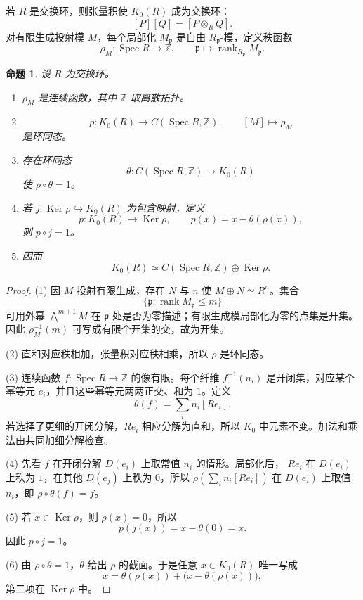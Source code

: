\documentclass[11pt,a4paper,openany]{ctexbook}
\numberwithin{equation}{chapter}
\newcommand{\Z}{\mathbb{Z}}
\newcommand{\Spec}{\operatorname{Spec}}
\newcommand{\Ker}{\operatorname{Ker}}
\theoremstyle{plain}
\newtheorem{proposition}[theorem]{命题}
\theoremstyle{definition}
\theoremstyle{remark}
\begin{document}
若 $R$ 是交换环，则张量积使 $K_0(R)$ 成为交换环：
\[
[P][Q]=[P\otimes_RQ].
\]
对有限生成投射模 $M$，每个局部化 $M_{\mathfrak p}$ 是自由 $R_{\mathfrak p}$-模，定义秩函数
\[
\rho_M:\Spec R\to\Z,\qquad
\mathfrak p\longmapsto\operatorname{rank}_{R_{\mathfrak p}}M_{\mathfrak p}.
\]

\begin{proposition}
设 $R$ 为交换环。
\begin{enumerate}[label=(\arabic*)]
\item $\rho_M$ 是连续函数，其中 $\Z$ 取离散拓扑。
\item
\[
\rho:K_0(R)\to C(\Spec R,\Z),\qquad [M]\mapsto\rho_M
\]
是环同态。
\item 存在环同态
\[
\theta:C(\Spec R,\Z)\to K_0(R)
\]
使 $\rho\circ\theta=1$。
\item 若 $j:\Ker\rho\hookrightarrow K_0(R)$ 为包含映射，定义
\[
p:K_0(R)\to\Ker\rho,\qquad p(x)=x-\theta(\rho(x)),
\]
则 $p\circ j=1$。
\item 因而
\[
K_0(R)\simeq C(\Spec R,\Z)\oplus\Ker\rho.
\]
\end{enumerate}
\end{proposition}

\begin{proof}
(1) 因 $M$ 投射有限生成，存在 $N$ 与 $n$ 使 $M\oplus N\simeq R^n$。集合
\[
\{\mathfrak p:\operatorname{rank}M_{\mathfrak p}\le m\}
\]
可用外幂 $\bigwedge^{m+1}M$ 在 $\mathfrak p$ 处是否为零描述；有限生成模局部化为零的点集是开集。因此 $\rho_M^{-1}(m)$ 可写成有限个开集的交，故为开集。

(2) 直和对应秩相加，张量积对应秩相乘，所以 $\rho$ 是环同态。

(3) 连续函数 $f:\Spec R\to\Z$ 的像有限。每个纤维 $f^{-1}(n_i)$ 是开闭集，对应某个幂等元 $e_i$，并且这些幂等元两两正交、和为 $1$。定义
\[
\theta(f)=\sum_i n_i[Re_i].
\]
若选择了更细的开闭分解，$Re_i$ 相应分解为直和，所以 $K_0$ 中元素不变。加法和乘法由共同加细分解检查。

(4) 先看 $f$ 在开闭分解 $D(e_i)$ 上取常值 $n_i$ 的情形。局部化后，
$Re_i$ 在 $D(e_i)$ 上秩为 $1$，在其他 $D(e_j)$ 上秩为 $0$，所以
$\rho(\sum_i n_i[Re_i])$ 在 $D(e_i)$ 上取值 $n_i$，即 $\rho\circ\theta(f)=f$。

(5) 若 $x\in\Ker\rho$，则 $\rho(x)=0$，所以
\[
p(j(x))=x-\theta(0)=x.
\]
因此 $p\circ j=1$。

(6) 由 $\rho\circ\theta=1$，$\theta$ 给出 $\rho$ 的截面。于是任意 $x\in K_0(R)$ 唯一写成
\[
x=\theta(\rho(x))+\bigl(x-\theta(\rho(x))\bigr),
\]
第二项在 $\Ker\rho$ 中。
\end{proof}
\end{document}
